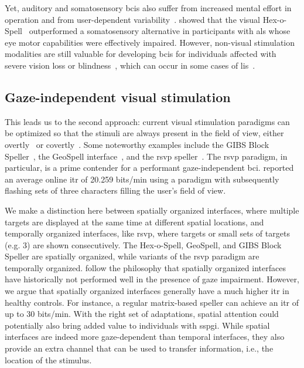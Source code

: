 Yet, auditory and somatosensory \acp{bci} also suffer from increased mental effort in
operation and from user-dependent variability~\cite{Severens2014,Reichert2020b}.
\textcite{Severens2014} showed that the visual Hex-o-Spell~\cite{Treder2010}
outperformed a somatosensory alternative in participants with \ac{als} whose
eye motor capabilities were effectively impaired.
However, non-visual stimulation modalities are still valuable for developing
\acp{bci} for individuals affected with severe vision loss or
blindness~\cite{Nijboer2008,Rutkowski2015}, which can occur in some cases of
\ac{lis}~\cite{Patterson1986}.

\subsection{Gaze-independent visual stimulation}
\label{sec:gaze-independence/sota/visual}

This leads us to the second approach: current visual stimulation paradigms can be optimized so that
the stimuli are always present in the field of view, either overtly~\cite{Acqualagna2013, Won2018, Lin2018} or covertly~\cite{Pires2011,Lees2018}.
Some noteworthy examples include the GIBS Block Speller~\parencite{Pires2011},
the GeoSpell interface~\parencite{Aloise2012}, and the \ac{rsvp}
speller~\parencite{Acqualagna2011}.
The \ac{rsvp} paradigm, in particular, is a prime contender for a performant gaze-independent
\ac{bci}.
\textcite{Lin2018} reported an average online \ac{itr} of 20.259 bits/min using
a paradigm with subsequently flashing sets of three characters filling the user's field of view.

We make a distinction here between spatially organized interfaces, where
multiple targets are displayed at the same time at different spatial locations,
and temporally organized interfaces, like \ac{rsvp}, where targets or small
sets of targets (e.g. 3) are shown consecutively.
The Hex-o-Spell, GeoSpell, and GIBS Block Speller are spatially organized, while
variants of the \ac{rsvp} paradigm are temporally organized.
\textcite{Lin2018} follow the philosophy that spatially organized interfaces
have historically not performed well in the presence of gaze impairment.
However, we argue that spatially organized interfaces generally have a much higher
\ac{itr} in healthy controls.
For instance, a regular matrix-based speller can achieve an \ac{itr} of up to
30 bits/min.
With the right set of adaptations, spatial attention could potentially also
bring added value to individuals with \ac{sspgi}.
While spatial interfaces are indeed more gaze-dependent than temporal
interfaces, they also provide an extra channel that can be used to transfer
information, i.e., the location of the stimulus.

